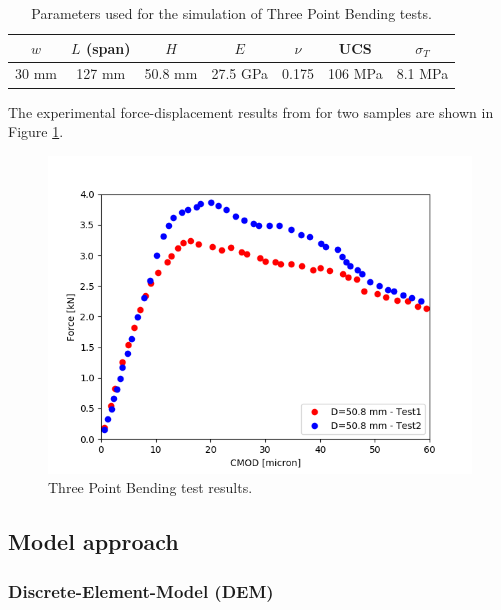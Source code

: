 \begin{table}[!ht]
\centering
\begin{tabular}{c c c |c c c c}
$w$ & $L$ (span) & $H$ & $E$ &  $\nu$ &  UCS  & $\sigma_T$  \\
\hline
30 mm & 127 mm & 50.8 mm  & 27.5 GPa & 0.175 & 106 MPa &  8.1 MPa \\
\end{tabular}
\caption{Parameters used for the simulation of Three Point Bending tests. 
\label{table:ME1_TPB_experiment}
}
\label{tabl:Numerical_param_for_sneddon_crack}
\end{table}
The experimental force-displacement results from \cite{Tarokh2016161} for two samples are shown in Figure \ref{fig:ME1_TPB_force_disp}.

\begin{figure}[!ht]
\centering
\includegraphics[width=1\textwidth]{figures/TPB_Force_Disp.png}
\caption{Three Point Bending test results.}
\label{fig:ME1_TPB_force_disp}
\end{figure}
\subsection{Model approach}
\subsubsection*{Discrete-Element-Model (DEM)}

